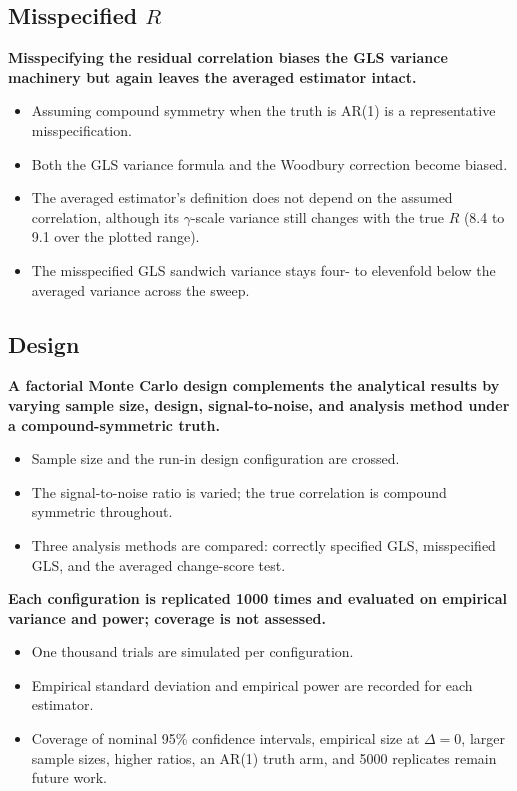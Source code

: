 \documentclass[
  11pt,
]{article}
\begin{document}
\subsection{\texorpdfstring{Misspecified \(R\)}{Misspecified R}}\label{misspecified-r}

\textbf{Misspecifying the residual correlation biases the GLS variance machinery but again leaves the averaged estimator intact.}

\begin{itemize}\setlength{\itemsep}{2pt}\setlength{\parskip}{0pt}
\item Assuming compound symmetry when the truth is AR(1) is a representative misspecification.
\item Both the GLS variance formula and the Woodbury correction become biased.
\item The averaged estimator's definition does not depend on the assumed correlation, although its $\gamma$-scale variance still changes with the true $R$ (8.4 to 9.1 over the plotted range).
\item The misspecified GLS sandwich variance stays four- to elevenfold below the averaged variance across the sweep.
\end{itemize}

\subsection{Design}\label{design}

\textbf{A factorial Monte Carlo design complements the analytical results by varying sample size, design, signal-to-noise, and analysis method under a compound-symmetric truth.}

\begin{itemize}\setlength{\itemsep}{2pt}\setlength{\parskip}{0pt}
\item Sample size and the run-in design configuration are crossed.
\item The signal-to-noise ratio is varied; the true correlation is compound symmetric throughout.
\item Three analysis methods are compared: correctly specified GLS, misspecified GLS, and the averaged change-score test.
\end{itemize}

\textbf{Each configuration is replicated 1000 times and evaluated on empirical variance and power; coverage is not assessed.}

\begin{itemize}\setlength{\itemsep}{2pt}\setlength{\parskip}{0pt}
\item One thousand trials are simulated per configuration.
\item Empirical standard deviation and empirical power are recorded for each estimator.
\item Coverage of nominal 95\% confidence intervals, empirical size at $\Delta = 0$, larger sample sizes, higher ratios, an AR(1) truth arm, and 5000 replicates remain future work.
\end{itemize}
\end{document}
